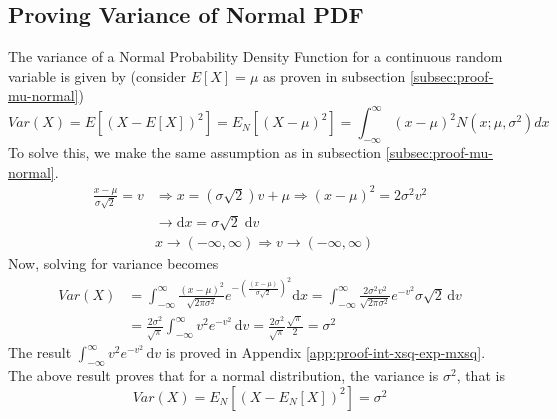 \documentclass[main.tex]{article}
\begin{document}
    \subsection[Proof of \texorpdfstring{$\sigma^2$}{variance}]{Proving Variance of Normal PDF}
    The variance of a Normal Probability Density Function for a continuous random variable is given by (consider $E[X]=\mu$ as proven in subsection \ref{subsec:proof-mu-normal})
    \begin{equation}
        Var(X) = E \left [ \left (X - E[X] \right )^2 \right ]
        = E_N \left [ \left (X - \mu \right )^2 \right ]
        = \int_{-\infty}^{\infty} \left ( x - \mu \right )^2 N(x;\mu,\sigma^2) dx
    \end{equation}
    To solve this, we make the same assumption as in subsection \ref{subsec:proof-mu-normal}.
    \begin{equation}
        \begin{split}
            \frac{x-\mu}{\sigma\sqrt{2}} = v & \Rightarrow x = \left ( \sigma\sqrt{2} \right ) v + \mu 
            \Rightarrow \left ( x - \mu \right )^2 = 2 \sigma^2 v^2 \\
            & \rightarrow \mathrm{d}x = \sigma \sqrt{2} \; \mathrm{d}v \\
            & x \rightarrow (-\infty, \infty) \Rightarrow v \rightarrow (-\infty, \infty)
        \end{split}
    \end{equation}
    Now, solving for variance becomes
    \begin{equation}
        \begin{split}
            Var(X)
            & = \int_{-\infty}^{\infty} \frac{\left ( x - \mu \right )^2}{\sqrt{2\pi \sigma^2}} e^{ -\left (\frac{(x-\mu)}{\sigma\sqrt{2}}\right )^2} \mathrm{d}x
            = \int_{-\infty}^{\infty} \frac{2\sigma^2 v^2}{\sqrt{2\pi \sigma^2}} e^{-v^2} \sigma \sqrt{2} \,\mathrm{d}v \\
            & = \frac{2\sigma^2}{\sqrt{\pi}} \int_{-\infty}^{\infty} v^2 e^{-v^2} \, \mathrm{d}v
            = \frac{2\sigma^2}{\sqrt{\pi}} \frac{\sqrt{\pi}}{2} = \sigma^2
        \end{split}
    \end{equation}
    The result $\int_{-\infty}^{\infty} v^2 e^{-v^2} \, \mathrm{d}v$ is proved in Appendix \ref{app:proof-int-xsq-exp-mxsq}. The above result proves that for a normal distribution, the variance is $\sigma^2$, that is
    \begin{equation}
        Var(X) = E_N \left [ \left (X - E_N[X] \right )^2 \right ] = \sigma^2
    \end{equation}
\end{document}
